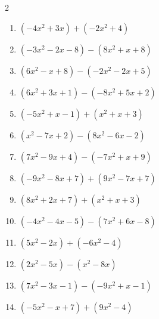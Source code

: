 \begin{multicols}{2}
\begin{enumerate}
  \item $(-4x^{2}+3x)+(-2x^{2}+4)$


  \item $(-3x^{2}-2x-8)-(8x^{2}+x+8)$


  \item $(6x^{2}-x+8)-(-2x^{2}-2x+5)$


  \item $(6x^{2}+3x+1)-(-8x^{2}+5x+2)$


  \item $(-5x^{2}+x-1)+(x^{2}+x+3)$


  \item $(x^{2}-7x+2)-(8x^{2}-6x-2)$


  \item $(7x^{2}-9x+4)-(-7x^{2}+x+9)$


  \item $(-9x^{2}-8x+7)+(9x^{2}-7x+7)$

        \phantom{$=-15x+14$}

  \item $(8x^{2}+2x+7)+(x^{2}+x+3)$


  \item $(-4x^{2}-4x-5)-(7x^{2}+6x-8)$


\columnbreak %

  \item $(5x^{2}-2x)+(-6x^{2}-4)$


  \item $(2x^{2}-5x)-(x^{2}-8x)$


  \item $(7x^{2}-3x-1)-(-9x^{2}+x-1)$


  \item $(-5x^{2}-x+7)+(9x^{2}-4)$


\end{enumerate}
\end{multicols}
